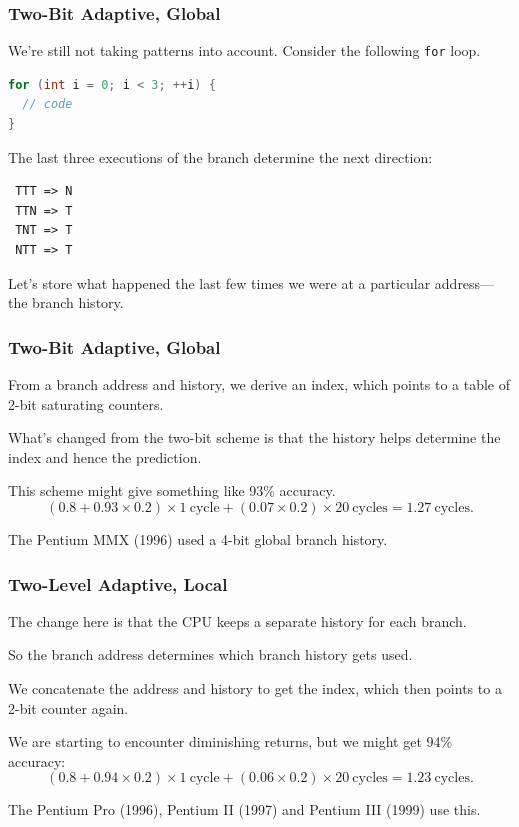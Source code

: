 \begin{frame}[fragile]
\frametitle{Two-Bit Adaptive, Global}

We're still not taking patterns into account. Consider the following {\tt for} loop.
\begin{lstlisting}[language=C]
for (int i = 0; i < 3; ++i) {
  // code
}
\end{lstlisting}
The last three executions of the branch determine the next direction:
\begin{verbatim}
 TTT => N
 TTN => T
 TNT => T
 NTT => T
\end{verbatim}

Let's store what happened the last few times we were at a particular address---the
\alert{branch history}. 

\end{frame}



\begin{frame}
\frametitle{Two-Bit Adaptive, Global}

From a branch address and history, we derive an index, which
points to a table of 2-bit saturating counters. 

What's changed from the two-bit scheme
is that the history helps determine the index and hence the prediction.

This scheme might give something like 93\% accuracy.
\[
(0.8 + 0.93 \times 0.2) \times 1 \mathrm{~cycle} + (0.07 \times 0.2) \times 20 \mathrm{~cycles} = 1.27 \mathrm{~cycles}.
\]

The Pentium MMX (1996) used a 4-bit global branch history.

\end{frame}



\begin{frame}
\frametitle{Two-Level Adaptive, Local}


The change here is that the CPU keeps a separate history for each branch.


So the branch address determines which branch history gets used.


We concatenate the address and history to get the index, which then points to a
2-bit counter again. 

We are starting to encounter diminishing returns, but we might
get 94\% accuracy:
\[
(0.8 + 0.94 \times 0.2) \times 1 \mathrm{~cycle} + (0.06 \times 0.2) \times 20 \mathrm{~cycles} = 1.23 \mathrm{~cycles}.
\]

The Pentium Pro (1996), Pentium II (1997) and Pentium III (1999) use this.


\end{frame}



